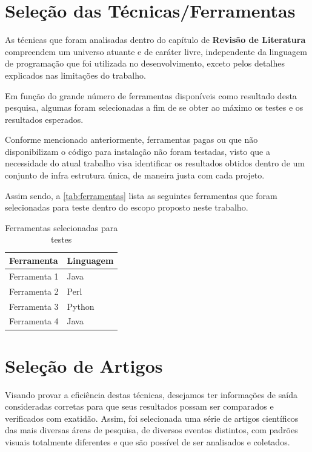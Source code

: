 \section{Seleção das Técnicas/Ferramentas}

As técnicas que foram analisadas dentro do capítulo de \textbf{Revisão de Literatura} compreendem um universo atuante e de caráter livre, independente da linguagem de programação que foi utilizada no desenvolvimento, exceto pelos detalhes explicados nas limitações do trabalho.

Em função do grande número de ferramentas disponíveis como resultado desta pesquisa, algumas foram selecionadas a fim de se obter ao máximo os testes e os resultados esperados.

Conforme mencionado anteriormente, ferramentas pagas ou que não disponibilizam o código para instalação não foram testadas, visto que a necessidade do atual trabalho visa identificar os resultados obtidos dentro de um conjunto de infra estrutura única, de maneira justa com cada projeto.

Assim sendo, a \autoref{tab:ferramentas} lista as seguintes ferramentas que foram selecionadas para teste dentro do escopo proposto neste trabalho.


\begin{table}
    \caption{Ferramentas selecionadas para testes}
    \begin{center}
    	\begin{tabular}{|p{6cm}|p{5cm}|}
			\hline \textbf{Ferramenta} & \textbf{Linguagem} \\ 
			\hline Ferramenta 1 & Java\\
			\hline Ferramenta 2 & Perl\\
			\hline Ferramenta 3 & Python\\
			\hline Ferramenta 4 & Java\\
	    	\hline 
    	\end{tabular} 
    \end{center}
  	\label{tab:ferramentas}
\end{table}

\section{Seleção de Artigos}

Visando provar a eficiência destas técnicas, desejamos ter informações de saída consideradas corretas para que seus resultados possam ser comparados e verificados com exatidão. Assim, foi selecionada uma série de artigos científicos das mais diversas áreas de pesquisa, de diversos eventos distintos, com padrões visuais totalmente diferentes e que são possível de ser analisados e coletados.

